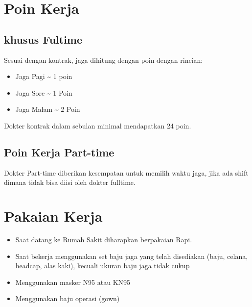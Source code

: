 \documentclass[
]{book}
\providecommand{\tightlist}{%
  \setlength{\itemsep}{0pt}\setlength{\parskip}{0pt}}
\begin{document}
\hypertarget{poin-kerja}{%
\section{Poin Kerja}\label{poin-kerja}}

\hypertarget{khusus-fultime}{%
\subsection*{khusus Fultime}\label{khusus-fultime}}

Sesuai dengan kontrak, jaga dihitung dengan poin dengan rincian:

\begin{itemize}
\item
  Jaga Pagi \textasciitilde{} 1 poin
\item
  Jaga Sore \textasciitilde{} 1 Poin
\item
  Jaga Malam \textasciitilde{} 2 Poin
\end{itemize}

Dokter kontrak dalam sebulan minimal mendapatkan 24 poin.

\hypertarget{poin-kerja-part-time}{%
\subsection*{Poin Kerja Part-time}\label{poin-kerja-part-time}}

Dokter Part-time diberikan kesempatan untuk memilih waktu jaga, jika ada shift dimana tidak bisa diisi oleh dokter fulltime.

\hypertarget{pakaian-kerja}{%
\section{Pakaian Kerja}\label{pakaian-kerja}}

\begin{itemize}
\tightlist
\item
  Saat datang ke Rumah Sakit diharapkan berpakaian Rapi.
\item
  Saat bekerja menggunakan set baju jaga yang telah disediakan (baju, celana, headcap, alas kaki), kecuali ukuran baju jaga tidak cukup
\item
  Menggunakan masker N95 atau KN95
\item
  Menggunakan baju operasi (gown)
\end{itemize}
\end{document}
